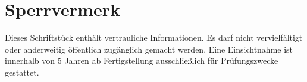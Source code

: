 \section*{Sperrvermerk}

\vspace{1cm}

\begin{large}
    Dieses Schriftstück enthält vertrauliche Informationen. Es darf nicht vervielfältigt oder anderweitig öffentlich zugänglich gemacht werden. Eine Einsichtnahme ist innerhalb von 5 Jahren ab Fertigstellung ausschließlich für Prüfungszwecke gestattet.
\end{large}